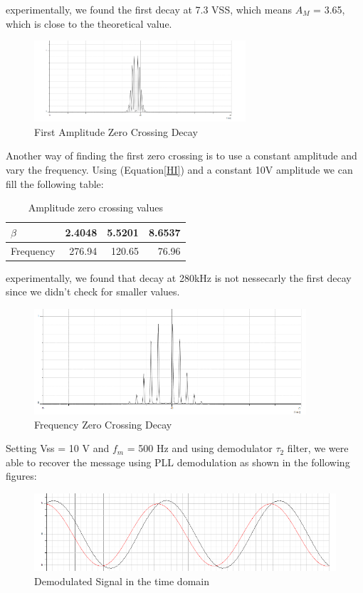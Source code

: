 \documentclass[12pt]{article}
\begin{document}
experimentally, we found the first decay at 7.3 VSS, which means $A_M$ = 3.65, which is close to the theoretical value.
\begin{figure}[H]
    \centering
    \includegraphics[width=0.7\textwidth]{assets/decay_1.png}
    \caption{First Amplitude Zero Crossing Decay}
\end{figure}
Another way of finding the first zero crossing is to use a constant amplitude and vary the frequency. Using (Equation\ref{HI}) and a constant 10V amplitude we can fill the following table:
\begin{table}[H]
    \centering
    \begin{tabular}{l|r|r|r}
        \hline
        $\beta$ & 2.4048 & 5.5201 & 8.6537 \\\hline
        Frequency & 276.94 & 120.65 & 76.96 \\\hline
    \end{tabular}
    \caption{Amplitude zero crossing values}
\end{table}
experimentally, we found that decay at 280kHz is not nessecarly the first decay since we didn't check for smaller values.
\begin{figure}[H]
    \centering
    \includegraphics[width=0.9\textwidth]{assets/decay_2.png}
    \caption{Frequency Zero Crossing Decay}
\end{figure}
Setting Vss = 10 V and $f_m$ = 500 Hz and using demodulator $\tau_2$ filter, we were able to recover the message using PLL demodulation as shown in the following figures:
\begin{figure}[H] 
    \centering
    \includegraphics[width=1\textwidth]{assets/d_t.png}
    \caption{Demodulated Signal in the time domain}
\end{figure}
\end{document}
